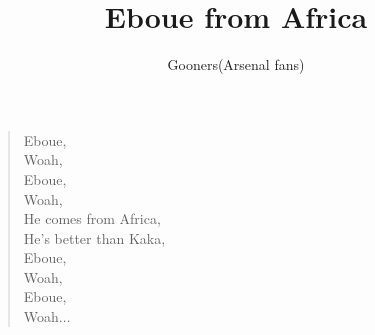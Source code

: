 \documentclass[a4paper,12pt]{article}
\title{Eboue from Africa}
\author{Gooners(Arsenal fans)}
\date{}
\begin{document}
	
	\maketitle
	
	\begin{verse}
		
		Eboue, \\
		Woah, \\
		Eboue, \\
		Woah, \\
		He comes from Africa, \\
		He's better than Kaka, \\
		Eboue, \\
		Woah, \\
		Eboue, \\
		Woah$\ldots$
		
	\end{verse}
	
\end{document}
